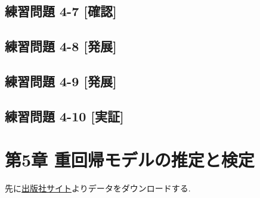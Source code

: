 \documentclass[
]{book}
\begin{document}
\hypertarget{ux7df4ux7fd2ux554fux984c-4-7-ux78baux8a8d}{%
\section*{練習問題 4-7 {[}確認{]}}\label{ux7df4ux7fd2ux554fux984c-4-7-ux78baux8a8d}}

\hypertarget{ux7df4ux7fd2ux554fux984c-4-8-ux767aux5c55}{%
\section*{練習問題 4-8 {[}発展{]}}\label{ux7df4ux7fd2ux554fux984c-4-8-ux767aux5c55}}

\hypertarget{ux7df4ux7fd2ux554fux984c-4-9-ux767aux5c55}{%
\section*{練習問題 4-9 {[}発展{]}}\label{ux7df4ux7fd2ux554fux984c-4-9-ux767aux5c55}}

\hypertarget{ux7df4ux7fd2ux554fux984c-4-10-ux5b9fux8a3c}{%
\section*{練習問題 4-10 {[}実証{]}}\label{ux7df4ux7fd2ux554fux984c-4-10-ux5b9fux8a3c}}

\hypertarget{ch5}{%
\chapter*{第5章 重回帰モデルの推定と検定}\label{ch5}}

先に\href{https://www.yuhikaku.co.jp/books/detail/9784641053854}{出版社サイト}よりデータをダウンロードする.
\end{document}
